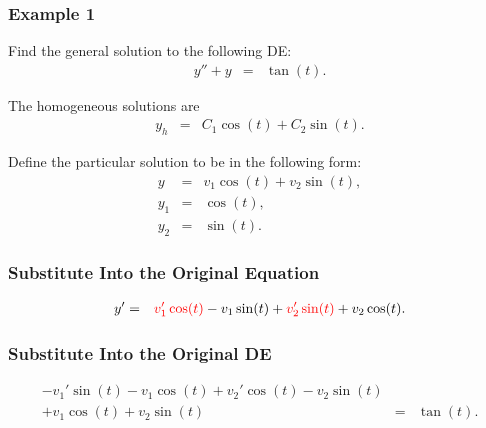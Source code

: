 \begin{frame}
  \frametitle{Example 1}
  Find the general solution to the following DE:
  \begin{eqnarray*}
    y'' + y & = & \tan(t).
  \end{eqnarray*}

  {
    The homogeneous solutions are
    \begin{eqnarray*}
      y_h & = & C_1 \cos(t) + C_2 \sin(t).
    \end{eqnarray*}
  }

  {
    Define the particular solution to be in the following form:
    \begin{eqnarray*}
      y & = & v_1 \cos(t) + v_2 \sin(t), \\
      y_1 & = & \cos(t), \\
      y_2 & = & \sin(t).
    \end{eqnarray*}
  }

\end{frame}

\begin{frame}
  \frametitle{Substitute Into the Original Equation}

  \begin{eqnarray*}
    y' & = & {\color{red}v_1' \cos(t)} - v_1 \sin(t) + {\color{red}v_2' \sin(t)} + v_2 \cos(t).
  \end{eqnarray*}




\end{frame}

\begin{frame}
  \frametitle{Substitute Into the Original DE}

  \begin{eqnarray*}
    - v_1' \sin(t) - v_1 \cos(t) + v_2' \cos(t) - v_2 \sin(t) & & \\
    + v_1 \cos(t) + v_2 \sin(t) & = & \tan(t).
  \end{eqnarray*}


\end{frame}

